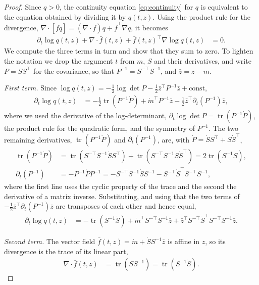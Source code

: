 \documentclass{article} %
\newcommand{\odedrift}{\bar f}
\newcommand{\tr}{\operatorname{tr}}
\begin{document}
\begin{proof}
Since $q > 0$, the continuity equation \cref{eq:continuity} for $q$ is equivalent to the equation obtained by dividing it by $q(t, z)$. Using the product rule for the divergence, $\nabla \cdot [\odedrift q] = (\nabla \cdot \odedrift) q + \odedrift^\top \nabla q$, it becomes
\begin{align}
    \partial_t \log q(t, z) + \nabla \cdot \odedrift(t,z) + \odedrift(t,z)^\top \nabla \log q(t, z) &= 0. \label{eq:logcontinuity}
\end{align}
We compute the three terms in turn and show that they sum to zero. To lighten the notation we drop the argument $t$ from $m$, $S$ and their derivatives, and write $P = S S^\top$ for the covariance, so that $P^{-1} = S^{-\top} S^{-1}$, and $\bar z = z - m$.

\emph{First term.} Since $\log q(t, z) = -\frac{1}{2} \log \det P - \frac{1}{2} \bar z^\top P^{-1} \bar z + \text{const}$,
\begin{align*}
    \partial_t \log q(t, z) &= -\frac{1}{2} \tr\left(P^{-1} \dot P\right) + \dot m^\top P^{-1} \bar z - \frac{1}{2} \bar z^\top \partial_t \left(P^{-1}\right) \bar z,
\end{align*}
where we used the derivative of the log-determinant, $\partial_t \log \det P = \tr(P^{-1} \dot P)$, the product rule for the quadratic form, and the symmetry of $P^{-1}$. The two remaining derivatives, $\tr(P^{-1} \dot P)$ and $\partial_t(P^{-1})$, are, with $\dot P = \dot S S^\top + S \dot S^\top$,
\begin{align*}
    \tr\left(P^{-1} \dot P\right) &= \tr\left(S^{-\top} S^{-1} \dot S S^\top\right) + \tr\left(S^{-\top} S^{-1} S \dot S^\top\right) = 2 \tr\left(S^{-1} \dot S\right), \\
    \partial_t \left(P^{-1}\right) &= -P^{-1} \dot P P^{-1} = -S^{-\top} S^{-1} \dot S S^{-1} - S^{-\top} \dot S^\top S^{-\top} S^{-1},
\end{align*}
where the first line uses the cyclic property of the trace and the second the derivative of a matrix inverse. Substituting, and using that the two terms of $-\frac{1}{2} \bar z^\top \partial_t(P^{-1}) \bar z$ are transposes of each other and hence equal,
\begin{align*}
    \partial_t \log q(t, z) &= -\tr\left(S^{-1} \dot S\right) + \dot m^\top S^{-\top} S^{-1} \bar z + \bar z^\top S^{-\top} \dot S^\top S^{-\top} S^{-1} \bar z.
\end{align*}

\emph{Second term.} The vector field $\odedrift(t, z) = \dot m + \dot S S^{-1} \bar z$ is affine in $z$, so its divergence is the trace of its linear part,
\begin{align*}
    \nabla \cdot \odedrift(t,z) &= \tr\left(\dot S S^{-1}\right) = \tr\left(S^{-1} \dot S\right).
\end{align*}


\end{proof}
\end{document}
